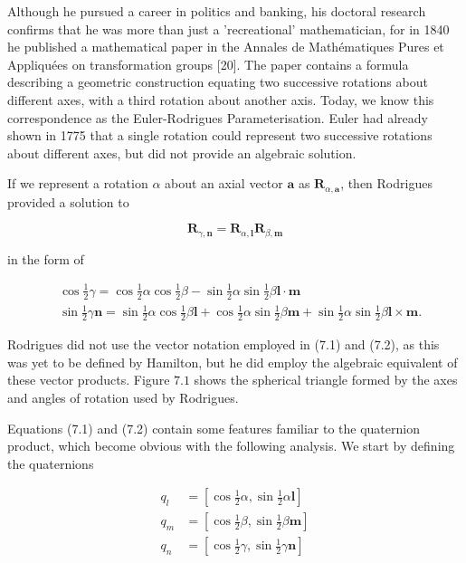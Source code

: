 Although he pursued a career in politics and banking, his doctoral research confirms that he was more than just a 'recreational' mathematician, for in 1840 he published a mathematical paper in the Annales de Mathématiques Pures et Appliquées on transformation groups [20]. The paper contains a formula describing a geometric construction equating two successive rotations about different axes, with a third rotation about another axis. Today, we know this correspondence as the Euler-Rodrigues Parameterisation. Euler had already shown in 1775 that a single rotation could represent two successive rotations about different axes, but did not provide an algebraic solution.

If we represent a rotation $\alpha$ about an axial vector $\mathbf{a}$ as $\mathbf{R}_{\alpha, \mathbf{a}}$, then Rodrigues provided a solution to

$$
\mathbf{R}_{\gamma, \mathbf{n}}=\mathbf{R}_{\alpha, \mathbf{l}} \mathbf{R}_{\beta, \mathbf{m}}
$$

in the form of

$$
\begin{aligned}
& \cos \frac{1}{2} \gamma=\cos \frac{1}{2} \alpha \cos \frac{1}{2} \beta-\sin \frac{1}{2} \alpha \sin \frac{1}{2} \beta \mathbf{l} \cdot \mathbf{m} \\
& \sin \frac{1}{2} \gamma \mathbf{n}=\sin \frac{1}{2} \alpha \cos \frac{1}{2} \beta \mathbf{l}+\cos \frac{1}{2} \alpha \sin \frac{1}{2} \beta \mathbf{m}+\sin \frac{1}{2} \alpha \sin \frac{1}{2} \beta \mathbf{l} \times \mathbf{m} .
\end{aligned}
$$

Rodrigues did not use the vector notation employed in (7.1) and (7.2), as this was yet to be defined by Hamilton, but he did employ the algebraic equivalent of these vector products. Figure $7.1$ shows the spherical triangle formed by the axes and angles of rotation used by Rodrigues.

Equations (7.1) and (7.2) contain some features familiar to the quaternion product, which become obvious with the following analysis. We start by defining the quaternions

$$
\begin{aligned}
q_{l} & =\left[\cos \frac{1}{2} \alpha, \sin \frac{1}{2} \alpha \mathbf{l}\right] \\
q_{m} & =\left[\cos \frac{1}{2} \beta, \sin \frac{1}{2} \beta \mathbf{m}\right] \\
q_{n} & =\left[\cos \frac{1}{2} \gamma, \sin \frac{1}{2} \gamma \mathbf{n}\right]
\end{aligned}
$$

